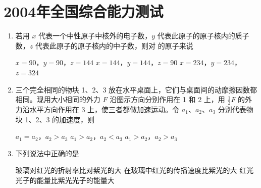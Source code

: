 \documentclass[\gkver]{gaokaozhenti}
\begin{document}
\chapter{2004年全国综合能力测试}

\begin{enumerate}
\item
若用 $x$ 代表一个中性原子中核外的电子数，$y$ 代表此原子的原子核内的质子数，$z$ 代表此原子的原子核内的中子数，则对  的原子来说

{$x=90$，$y=90$，$z=144$}
{$x=144$，$y=144$，$z=90$}
{$x=234$，$y=234$，$z=324$}


\item
三个完全相同的物块 1、2、3 放在水平桌面上，它们与桌面间的动摩擦因数都相同。现用大小相同的外力 $F$ 沿图示方向分别作用在 1 和 2 上，用 $\frac{1}{2}F$ 的外力沿水平方向作用在 3 上，使三者都做加速运动。令 $a_{1}$、$a_{2}$、$a_{3}$ 分别代表物块 1、2、3 的加速度，则


{$a_{1}=a_{2}$，$a_{2}>a_{3}$}
{$a_{1}>a_{2}$，$a_{2}<a_{3}$}
{$a_{1}>a_{2}$，$a_{2}>a_{3}$}


\item
下列说法中正确的是

{玻璃对红光的折射率比对紫光的大}
{在玻璃中红光的传播速度比紫光的大}
{红光光子的能量比紫光光子的能量大}



\end{enumerate}
\end{document}
